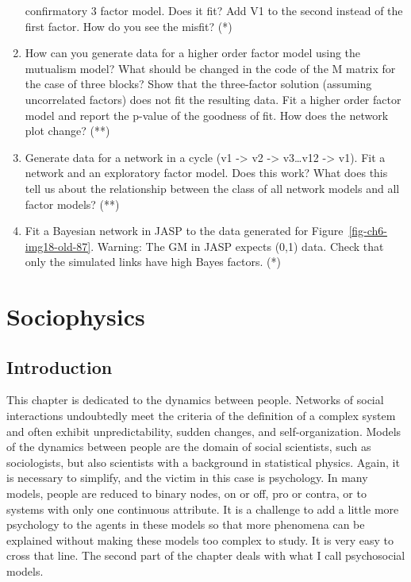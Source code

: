 \documentclass[
  a4paper,
  DIV=11,
  numbers=noendperiod]{scrreprt}
\begin{document}
\begin{enumerate}
  confirmatory 3 factor model. Does it fit? Add V1 to the second instead
  of the first factor. How do you see the misfit? (*)
\item
  How can you generate data for a higher order factor model using the
  mutualism model? What should be changed in the code of the M matrix
  for the case of three blocks? Show that the three-factor solution
  (assuming uncorrelated factors) does not fit the resulting data. Fit a
  higher order factor model and report the p-value of the goodness of
  fit. How does the network plot change? (**)
\item
  Generate data for a network in a cycle (v1 -\textgreater{} v2
  -\textgreater{} v3\ldots v12 -\textgreater{} v1). Fit a network and an
  exploratory factor model. Does this work? What does this tell us about
  the relationship between the class of all network models and all
  factor models? (**)
\item
  Fit a Bayesian network in JASP to the data generated for
  Figure~\ref{fig-ch6-img18-old-87}. Warning: The GM in JASP expects
  (0,1) data. Check that only the simulated links have high Bayes
  factors. (*)
\end{enumerate}


\hypertarget{sec-ch7}{%
\chapter{Sociophysics}\label{sec-ch7}}

\hypertarget{sec-Introduction}{%
\section{Introduction}\label{sec-Introduction}}

This chapter is dedicated to the dynamics between people. Networks of
social interactions undoubtedly meet the criteria of the definition of a
complex system and often exhibit unpredictability, sudden changes, and
self-organization. Models of the dynamics between people are the domain
of social scientists, such as sociologists, but also scientists with a
background in statistical physics. Again, it is necessary to simplify,
and the victim in this case is psychology. In many models, people are
reduced to binary nodes, on or off, pro or contra, or to systems with
only one continuous attribute. It is a challenge to add a little more
psychology to the agents in these models so that more phenomena can be
explained without making these models too complex to study. It is very
easy to cross that line. The second part of the chapter deals with what
I call psychosocial models.
\end{document}
